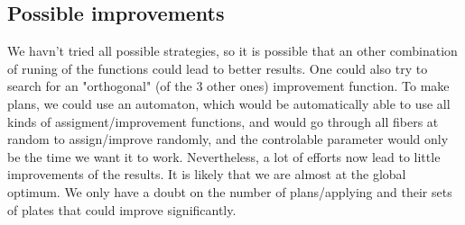 \documentclass{extarticle}
\begin{document}
\begin{multicols}{2}

\section{Possible improvements}
We havn't tried all possible strategies, so it is possible that an other combination of runing of the functions could lead to better results.
One could also try to search for an "orthogonal" (of the 3 other ones) improvement function.
To make plans, we could use an automaton, which would be automatically able to use all kinds of assigment/improvement functions, and would go through all fibers at random to assign/improve randomly, and the controlable parameter would only be the time we want it to work.
Nevertheless, a lot of efforts now lead to little improvements of the results. It is likely that we are almost at the global optimum. We only have a doubt on the number of plans/applying and their sets of plates that could improve significantly.


{}

\end{multicols}
\end{document}
